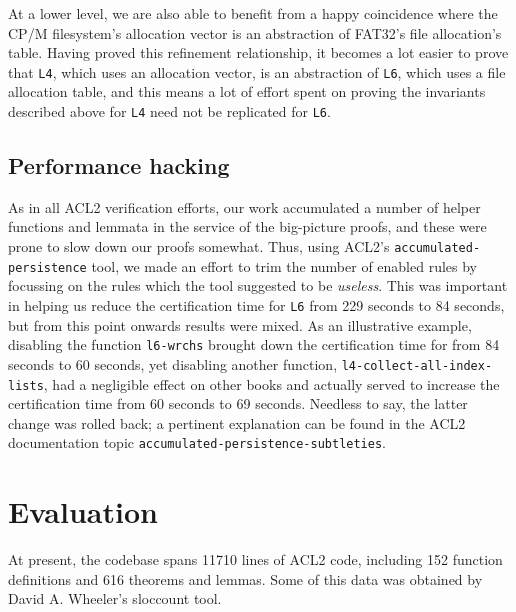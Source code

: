 \documentclass[runningheads,a4paper]{llncs}
\begin{document}
At a lower level, we are also able to benefit from a happy coincidence
where the CP/M filesystem's allocation vector is an abstraction of
FAT32's file allocation's table. Having proved this refinement
relationship, it becomes a lot easier to prove that \texttt{L4}, which
uses an allocation vector, is an abstraction of \texttt{L6}, which
uses a file allocation table, and this means a lot of effort spent on
proving the invariants described above for \texttt{L4} need not be
replicated for \texttt{L6}.

\subsection{Performance hacking}

As in all ACL2 verification efforts, our work accumulated a number of
helper functions and lemmata in the service of the big-picture proofs,
and these were prone to slow down our proofs somewhat. Thus, using
ACL2's \texttt{accumulated-persistence} tool, we made an effort to
trim the number of enabled rules by focussing on the rules which the
tool suggested to be \textit{useless}. This was important in helping us reduce
the certification time for \texttt{L6} from 229 seconds to 84 seconds,
but from this point onwards results were mixed. As an illustrative
example, disabling the function \texttt{l6-wrchs} brought down the
certification time for  from 84 seconds to 60 seconds, yet
disabling another function, \texttt{l4-collect-all-index-lists}, had a
negligible effect on other books and actually served to increase the
certification time from 60 seconds to 69 seconds. Needless to say, the
latter change was rolled back; a pertinent explanation can be found in
the ACL2 documentation topic \texttt{accumulated-persistence-subtleties}.


\section{Evaluation}
At present, the codebase spans 11710 lines of ACL2 code, including 152
function definitions and 616 theorems and lemmas. Some of this data was
obtained by David A. Wheeler's sloccount tool.
\end{document}
